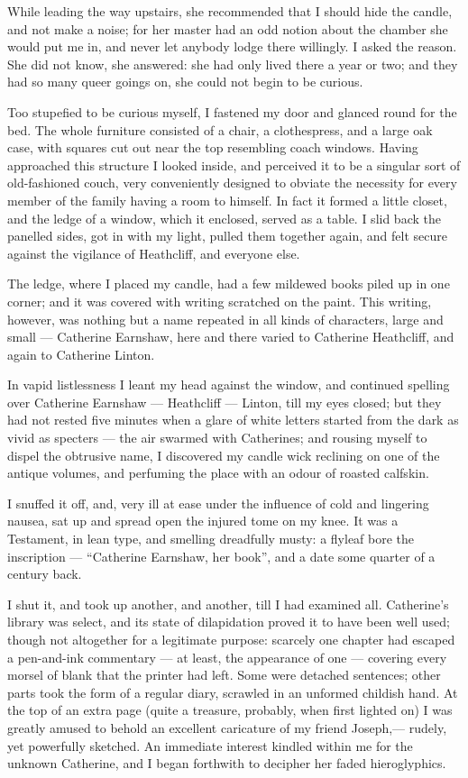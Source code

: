 \par While leading the way upstairs, she recommended that I should hide the candle, and not make a noise; for her master had an odd notion about the chamber she would put me in, and never let anybody lodge there willingly. I asked the reason. She did not know, she answered: she had only lived there a year or two; and they had so many queer goings on, she could not begin to be curious.
\par Too stupefied to be curious myself, I fastened my door and glanced round for the bed. The whole furniture consisted of a chair, a clothespress, and a large oak case, with squares cut out near the top resembling coach windows. Having approached this structure I looked inside, and perceived it to be a singular sort of old-fashioned couch, very conveniently designed to obviate the necessity for every member of the family having a room to himself. In fact it formed a little closet, and the ledge of a window, which it enclosed, served as a table. I slid back the panelled sides, got in with my light, pulled them together again, and felt secure against the vigilance of Heathcliff, and everyone else.
\par The ledge, where I placed my candle, had a few mildewed books piled up in one corner; and it was covered with writing scratched on the paint. This writing, however, was nothing but a name repeated in all kinds of characters, large and small — Catherine Earnshaw, here and there varied to Catherine Heathcliff, and again to Catherine Linton.
\par In vapid listlessness I leant my head against the window, and continued spelling over Catherine Earnshaw — Heathcliff — Linton, till my eyes closed; but they had not rested five minutes when a glare of white letters started from the dark as vivid as specters — the air swarmed with Catherines; and rousing myself to dispel the obtrusive name, I discovered my candle wick reclining on one of the antique volumes, and perfuming the place with an odour of roasted calfskin.
\par I snuffed it off, and, very ill at ease under the influence of cold and lingering nausea, sat up and spread open the injured tome on my knee. It was a Testament, in lean type, and smelling dreadfully musty: a flyleaf bore the inscription — “Catherine Earnshaw, her book”, and a date some quarter of a century back.
\par I shut it, and took up another, and another, till I had examined all. Catherine's library was select, and its state of dilapidation proved it to have been well used; though not altogether for a legitimate purpose: scarcely one chapter had escaped a pen-and-ink commentary — at least, the appearance of one — covering every morsel of blank that the printer had left. Some were detached sentences; other parts took the form of a regular diary, scrawled in an unformed childish hand. At the top of an extra page (quite a treasure, probably, when first lighted on) I was greatly amused to behold an excellent caricature of my friend Joseph,— rudely, yet powerfully sketched. An immediate interest kindled within me for the unknown Catherine, and I began forthwith to decipher her faded hieroglyphics.
